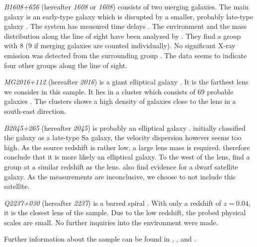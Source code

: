 \documentclass[useAMS,usenatbib]{mn2e}
\begin{document}
\textit{B1608+656} (hereafter \textit{1608} or \textit{1608}) consists of two merging galaxies. The main galaxy is an early-type galaxy which is disrupted by a smaller, probably late-type galaxy \citep{2003ApJ...584..100S}. The system has measured time delays \citep{2002ApJ...581..823F}. The environment and the mass distribution along the line of sight have been analyzed by \cite{2006ApJ...642...30F}. They find a group with 8 (9 if merging galaxies are counted individually). No significant X-ray emission was detected from the surrounding group \citep{2005ApJ...625..633D}. The data seems to indicate four other groups along the line of sight.

\textit{MG2016+112} (hereafter \textit{2016}) is a giant elliptical galaxy \citep{1984Sci...223...46L,1986AJ.....91..991S}. It is the farthest lens we consider in this sample. It lies in a cluster which consists of 69 probable galaxies \citep{2003MNRAS.344..337T}. The clusters shows a high density of galaxies close to the lens in a south-east direction.

\textit{B2045+265} (hereafter \textit{2045}) is probably an elliptical galaxy \citep{2007MNRAS.378..109M}. \cite{1999AJ....117..658F} initially classified the galaxy as a late-type Sa galaxy, the velocity dispersion however seems too high. As the source redshift is rather low, a large lens mass is required. \cite{2007MNRAS.378..109M} therefore conclude that it is more likely an elliptical galaxy. To the west of the lens, \cite{1999AJ....117..658F} find a group at a similar redshift as the lens. \cite{2007MNRAS.378..109M} also find evidence for a dwarf satellite galaxy. As the measurements are inconclusive, we choose to not include this satellite.

\textit{Q2237+030} (hereafter \textit{2237}) is a barred spiral \citep{1988AJ.....95.1331Y}. With only a redshift of $z=0.04$, it is the closest lens of the sample. Due to the low redshift, the probed physical scales are small. No further inquiries into the environment were made.

Further information about the sample can be found in \cite{leier11phd}, \cite{2011ApJ...740...97L}, and \cite{2012A&A...538A..99S}.
\end{document}
